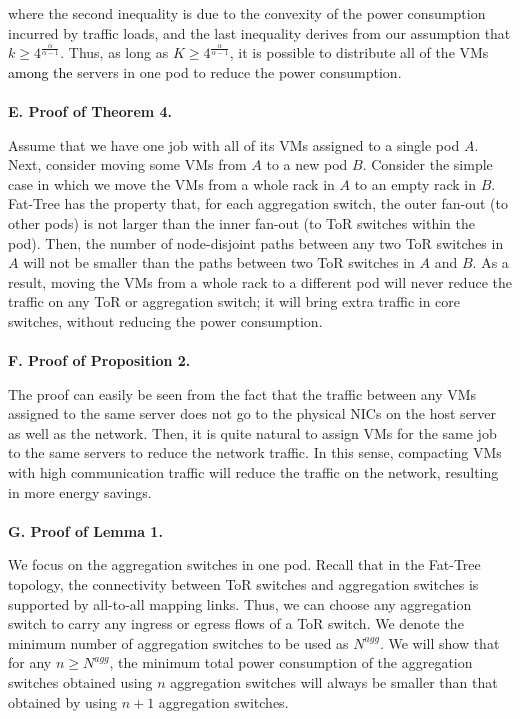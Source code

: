 \documentclass[journal,single-space,two column,twoside,10pt]{IEEEtran}
\begin{document}
where the second inequality is due to the convexity of the power consumption incurred by traffic loads, and the last inequality derives from our assumption that $k \geq 4^{\frac{\alpha}{\alpha - 1}}$. Thus, as long as $K \geq 4^{\frac{\alpha}{\alpha - 1}}$, it is possible to distribute all of the VMs \textcolor{black}{among the} servers in one pod to reduce the power consumption.
\\\\
\noindent\textbf{E. Proof of Theorem 4.}

Assume that we have one job with all of its VMs assigned to a single pod $A$. Next, consider moving some VMs from $A$ to a new pod $B$. Consider the simple case in which we move the VMs from a whole rack in $A$ to an empty rack in $B$. Fat-Tree has the property that, for each aggregation switch, the outer fan-out (to other pods) is not larger than the inner fan-out (to ToR switches within the pod). Then, the number of node-disjoint paths between any two ToR switches in $A$ will not be smaller than the paths between two ToR switches in $A$ and $B$. As a result, moving the VMs from a whole rack to a different pod will never reduce the traffic on any ToR or aggregation switch; it will bring extra traffic in core switches, without reducing the power consumption.
\\\\
\noindent\textbf{F. Proof of Proposition 2.}

The proof can easily be seen from the fact that the traffic between any VMs assigned to the same server does not go to the physical NICs on the host server as well as the network. Then, it is quite natural to assign VMs for the same job to the same servers to reduce the network traffic. In this sense, compacting VMs with high communication traffic will reduce the traffic on the network, resulting in more energy savings.
\\\\
\noindent\textbf{G. Proof of Lemma 1.}

We focus on the aggregation switches in one pod. Recall that in the Fat-Tree topology, the connectivity between ToR switches and aggregation switches is supported by all-to-all mapping links. Thus, we can choose any aggregation switch to carry any ingress or egress flows of a ToR switch. We denote the minimum number of aggregation switches to be used as $N^{agg}$. We will show that for any $n \geq N^{agg}$, the minimum total power consumption of the aggregation switches obtained using $n$ aggregation switches will always be smaller than that obtained by using $n+1$ aggregation switches.
\end{document}
